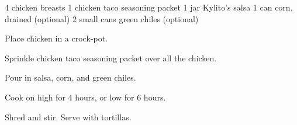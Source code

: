 \dishtype{\main}
\begin{ingreds}
    4 chicken breasts
    1 chicken taco seasoning packet
    1 jar Kylito's salsa
    1 can corn, drained (optional)
    2 small cans green chiles (optional)
\end{ingreds}
\begin{method}
    Place chicken in a crock-pot.\par
    Sprinkle chicken taco seasoning packet over all the chicken.\par
    Pour in salsa, corn, and green chiles.\par
    Cook on high for 4 hours, or low for 6 hours.\par
    Shred and stir. Serve with tortillas.
\end{method}